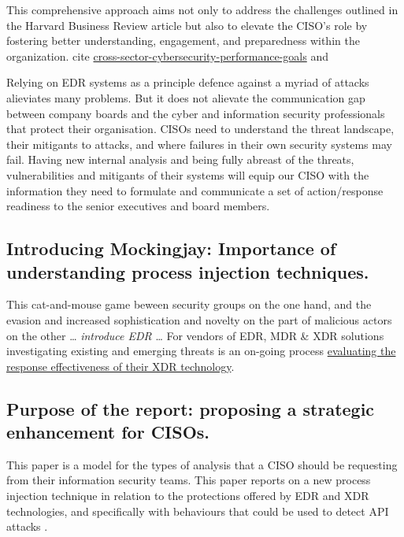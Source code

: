 This comprehensive approach aims not only to address the challenges outlined in the Harvard Business Review article but also to elevate the CISO's role by fostering better understanding, engagement, and preparedness within the organization. cite \href{https://www.cisa.gov/cross-sector-cybersecurity-performance-goals}{cross-sector-cybersecurity-performance-goals} and 



Relying on EDR systems as a principle defence against a myriad of attacks alieviates many problems.  But it does not alievate the communication gap between company boards
and the cyber and information security professionals that protect their organisation.  CISOs need to understand the threat landscape, their mitigants to attacks, and
where failures in their own security systems may fail.  Having new internal analysis and being fully abreast of the threats, vulnerabilities and mitigants of their
systems will equip our CISO with the information they need to formulate and communicate a set of action/response readiness to the senior executives and board members. 

\subsection{Introducing Mockingjay: Importance of understanding process injection techniques.}

This cat-and-mouse game beween security groups on the one hand, and the evasion and increased sophistication and novelty on the part of malicious actors on the other \ldots
\textit{introduce EDR} \ldots
For vendors of EDR, MDR \& XDR solutions investigating existing and emerging threats is an on-going process \href{https://research.tue.nl/files/305661196/Olteanu_I.C..pdf}{evaluating the response effectiveness of their XDR technology}.


\subsection{Purpose of the report: proposing a strategic enhancement for CISOs.}

This paper is a model for the types of analysis that a CISO should be requesting from their information security teams.  This paper reports on a new process injection technique \autocite{Peixoto:2023} in relation to the protections offered by EDR and XDR technologies, and specifically with behaviours that could be used to detect API attacks \autocite{Wang:2022}.

